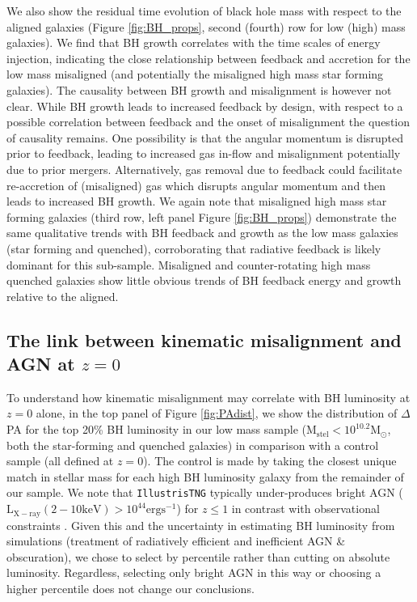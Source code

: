 We also show the residual time evolution of black hole mass with respect to the aligned galaxies (Figure \ref{fig:BH_props}, second (fourth) row for low (high) mass galaxies). We find that BH growth correlates with the time scales of energy injection, indicating the close relationship between feedback and accretion for the low mass misaligned (and potentially the misaligned high mass star forming galaxies). The causality between BH growth and misalignment is however not clear. While BH growth leads to increased feedback by design, with respect to a possible correlation between feedback and the onset of misalignment the question of causality remains. One possibility is that the angular momentum is disrupted prior to feedback, leading to increased gas in-flow and misalignment potentially due to prior mergers. Alternatively, gas removal due to feedback could facilitate re-accretion of (misaligned) gas which disrupts angular momentum and then leads to increased BH growth. We again note that misaligned high mass star forming galaxies (third row, left panel Figure \ref{fig:BH_props}) demonstrate the same qualitative trends with BH feedback and growth as the low mass galaxies (star forming and quenched), corroborating that radiative feedback is likely dominant for this sub-sample. Misaligned and counter-rotating high mass quenched galaxies show little obvious trends of BH feedback energy and growth relative to the aligned.

\subsection{The link between kinematic misalignment and AGN at $z=0$}
To understand how kinematic misalignment may correlate with BH luminosity at $z=0$ alone, in the top panel of Figure \ref{fig:PAdist}, we show the distribution of $\Delta$PA for the top 20\% BH luminosity in our low mass sample ($\mathrm{M_{stel} < 10^{10.2}M_{\odot}}$, both the star-forming and quenched galaxies) in comparison with a control sample (all defined at $z=0$). The control is made by taking the closest unique match in stellar mass for each high BH luminosity galaxy from the remainder of our sample. We note that \texttt{IllustrisTNG}  typically under-produces bright AGN ($\mathrm{L_{X-ray}(2-10 keV) > 10^{44}ergs^{-1}}$) for $z \leq 1$ in contrast with observational constraints \citep[see][]{habouzit2019}. Given this and the uncertainty in estimating BH luminosity from simulations (treatment of radiatively efficient and inefficient AGN \& obscuration), we chose to select by percentile rather than cutting on absolute luminosity. Regardless, selecting only bright AGN in this way or choosing a higher percentile does not change our conclusions.

